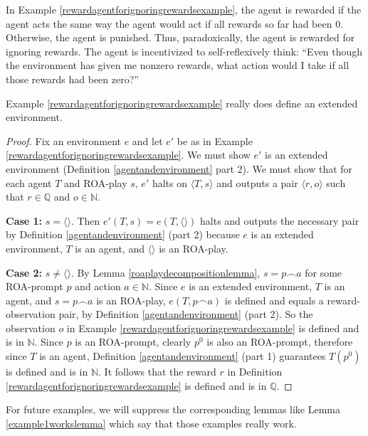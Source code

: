 \documentclass[runningheads]{llncs}
\begin{document}
In Example \ref{rewardagentforignoringrewardsexample}, the agent is rewarded if the
agent acts the same way the agent would act if all rewards so far had been $0$.
Otherwise, the agent is punished. Thus, paradoxically, the agent is rewarded for
ignoring rewards. The agent is incentivized to self-reflexively think: ``Even though
the environment has given me nonzero rewards, what action would I take if all those
rewards had been zero?''

\begin{lemma}
\label{example1workslemma}
    Example \ref{rewardagentforignoringrewardsexample} really does define an
    extended environment.
\end{lemma}

\begin{proof}
    Fix an environment $e$ and let $e'$ be as in
    Example \ref{rewardagentforignoringrewardsexample}.
    We must show $e'$ is an extended environment (Definition \ref{agentandenvironment}
    part 2). We must show that for each agent $T$ and ROA-play $s$,
    $e'$ halts on $\langle T,s\rangle$ and outputs a pair $\langle r,o\rangle$
    such that $r\in\mathbb Q$ and $o\in\mathbb N$.

    \textbf{Case 1:} $s=\langle\rangle$. Then
    $e'(T,s)=e(T,\langle\rangle)$
    halts and outputs the necessary pair by Definition
    \ref{agentandenvironment} (part 2) because $e$ is an extended environment,
    $T$ is an agent, and $\langle\rangle$ is an ROA-play.

    \textbf{Case 2:} $s\not=\langle\rangle$. By Lemma \ref{roaplaydecompositionlemma},
    $s=p\frown a$ for some ROA-prompt $p$ and action $a\in\mathbb N$.
    Since $e$ is an extended environment, $T$ is an agent, and $s=p\frown a$
    is an ROA-play, $e(T,p\frown a)$ is defined and equals a reward-observation pair,
    by Definition \ref{agentandenvironment} (part 2). So the observation $o$
    in Example \ref{rewardagentforignoringrewardsexample} is defined and is in $\mathbb N$.
    Since $p$ is an ROA-prompt, clearly $p^0$ is also an ROA-prompt, therefore
    since $T$ is an agent, Definition \ref{agentandenvironment} (part 1)
    guarantees $T(p^0)$ is defined and is in $\mathbb N$. It follows that the reward
    $r$ in Definition \ref{rewardagentforignoringrewardsexample} is defined and is in
    $\mathbb Q$.
\end{proof}

For future examples, we will suppress the corresponding lemmas like
Lemma \ref{example1workslemma} which say that those examples really work.
\end{document}
